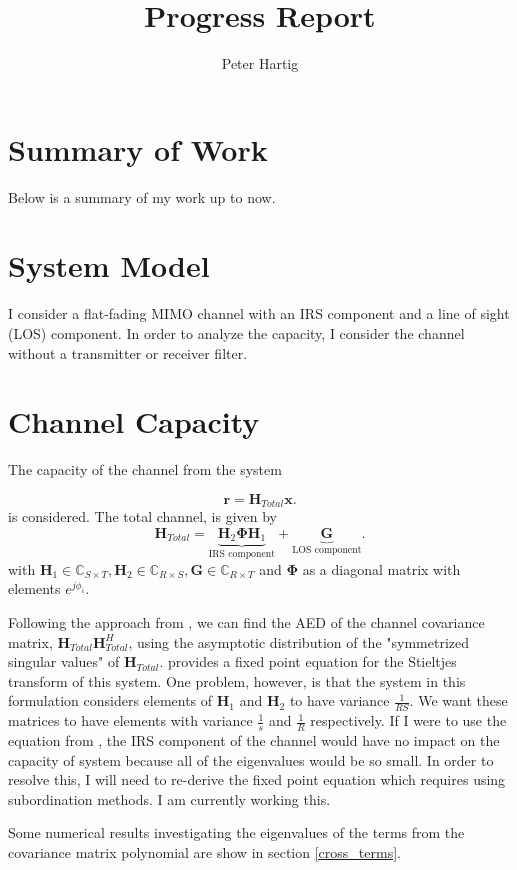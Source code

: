 \documentclass[12pt,a4paper]{report}
\title{Progress Report}
\author{Peter Hartig}
\begin{document}
\maketitle
\tableofcontents


\section{Summary of Work}
Below is a summary of my work up to now.
\section{System Model}
I consider a flat-fading MIMO channel with an IRS component and a line of sight (LOS) component. In order to analyze the capacity, I consider the channel without a transmitter or receiver filter.

\section{Channel Capacity}
The capacity of the channel from the system 

	 \begin{equation}\label{system_model}
		\mathbf{r} = \mathbf{H}_{Total}\mathbf{x}.
	\end{equation} is considered. 
	The total channel, is given by
	\begin{equation}
	\mathbf{H}_{Total} =  \underbrace{\mathbf{H}_{2}\boldsymbol{\Phi}\mathbf{H}_{1}}_{\text{IRS component}} + \underbrace{\mathbf{G}}_{\text{LOS component}}.
	\end{equation}
	with 
	$\mathbf{H}_{1}\in \mathbb{C}_{S \times T},\mathbf{H}_{2} \in \mathbb{C}_{R \times S}, \mathbf{G} \in \mathbb{C}_{R \times T}$ and $\boldsymbol{\Phi}$ as a diagonal matrix with elements $e^{j\phi_i}$.

Following the approach from \cite{muller2012channel}, we can find the AED of the channel 
covariance matrix, $\mathbf{H}_{Total}\mathbf{H}_{Total}^H$, using the asymptotic distribution of the "symmetrized singular values" of $\mathbf{H}_{Total}$.\cite{muller2012channel} provides a fixed point equation for the Stieltjes transform of this system. One problem, however, is that the system in this formulation considers
 elements of $ \mathbf{H}_{1}$ and  $\mathbf{H}_{2}$ to have variance $\frac{1}{RS}$. We want these
  matrices to have elements with variance $\frac{1}{s}$ and $\frac{1}{R}$ respectively.
  If I were to use the equation from \cite{muller2012channel}, the IRS component of the channel would have no impact on the capacity of system because all of the eigenvalues would be so small. In order to resolve this, I will need to re-derive the fixed point equation which requires using subordination methods. I am currently working this.
 \par
 Some numerical results investigating the eigenvalues of the terms from the covariance matrix polynomial are show in 
 section \ref{cross_terms}.
\end{document}
